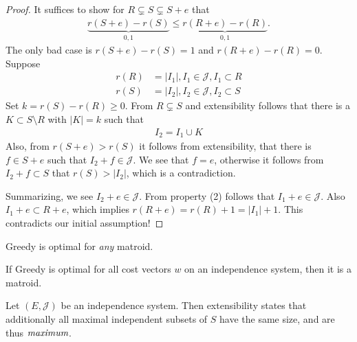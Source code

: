 \begin{proof}
    It suffices to show for $R \subsetneq S \subsetneq S+e$ that
    \begin{align*}
        \underbrace{r(S+e) - r(S)}_{0,1} \leq \underbrace{r(R+e) - r(R)}_{0,1}.
    \end{align*}
    The only bad case is $r(S+e)-r(S)=1$ and $r(R+e)-r(R)=0$.
    Suppose
    \begin{align*}
        r(R) & = |I_1|, I_1 \in \mathcal{J}, I_1 \subset R \\
        r(S) & = |I_2|, I_2 \in \mathcal{J}, I_2 \subset S
    \end{align*}
    Set $k = r(S)-r(R) \geq 0$.
    From $R \subsetneq S$ and extensibility follows that
    there is a $K \subset S \setminus R$ with $|K|=k$ such that
    \begin{align*}
        I_2=I_1 \cup K
    \end{align*}
    Also, from $r(S+e) > r(S)$ it follows from extensibility, that there is $f \in S + e$ such that $I_2+f \in \mathcal{J}$.
    We see that $f=e$, otherwise it follows from $I_2+f \subset S$ that $r(S) > |I_2|$, which is a contradiction.

    Summarizing, we see $I_2+e \in \mathcal{J}$.
    From property (2) follows that $I_1+e \in \mathcal{J}$.
    Also $I_1 +e \subset R +e$, which implies $r(R+e)=r(R)+1=|I_1|+1$. This contradicts our initial assumption!
\end{proof}
\begin{corollary}
    Greedy is optimal for \emph{any} matroid.
\end{corollary}
\begin{theorem} \label{thm:greedy-ind-is-matroid}
    If Greedy is optimal for all cost vectors $w$ on an independence system, then it is a matroid.
\end{theorem}
Let $(E,\mathcal{J})$ be an independence system. Then extensibility states
that additionally all maximal independent subsets of $S$ have the same size, and are thus $\emph{maximum}$.
